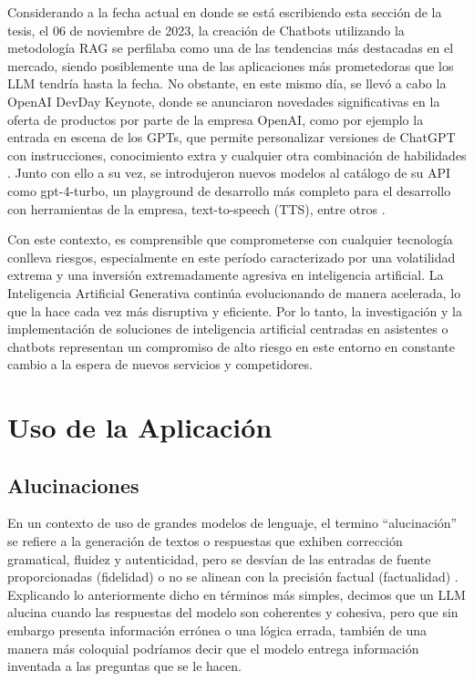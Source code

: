 Considerando a la fecha actual en donde se está escribiendo esta sección de la tesis, el 06 de noviembre de 2023, la creación de Chatbots utilizando la metodología RAG se perfilaba como 
una de las tendencias más destacadas en el mercado, siendo posiblemente una de las aplicaciones más prometedoras que los LLM tendría hasta la fecha. 
No obstante, en este mismo día, se llevó a cabo la OpenAI DevDay Keynote, donde se anunciaron novedades significativas en la oferta de productos por parte de la empresa OpenAI, como por ejemplo la entrada en 
escena de los GPTs, que permite personalizar versiones de ChatGPT con instrucciones, conocimiento extra y cualquier otra combinación 
de habilidades \cite{openai2}. Junto con ello a su vez, se introdujeron nuevos modelos al catálogo de su API como gpt-4-turbo, un playground de desarrollo más completo para el desarrollo con herramientas de la empresa, 
text-to-speech (TTS), entre otros \cite{openai3}.

Con este contexto, es comprensible que comprometerse con cualquier tecnología conlleva riesgos, especialmente en este período caracterizado por una 
volatilidad extrema y una inversión extremadamente agresiva en inteligencia artificial. La Inteligencia Artificial Generativa 
continúa evolucionando de manera acelerada, lo que la hace cada vez más disruptiva y eficiente. Por lo tanto, la investigación 
y la implementación de soluciones de inteligencia artificial centradas en asistentes o chatbots representan un compromiso de alto 
riesgo en este entorno en constante cambio a la espera de nuevos servicios y competidores.


\newpage

\section{Uso de la Aplicación}

\subsection{Alucinaciones}

En un contexto de uso de grandes modelos de lenguaje, el termino ``alucinación'' se refiere a la generación de textos o respuestas que exhiben corrección gramatical, fluidez y autenticidad,
pero se desvían de las entradas de fuente proporcionadas (fidelidad) o no se alinean con la precisión factual (factualidad) \cite{alucionacion1}.
Explicando lo anteriormente dicho en términos más simples, decimos que un LLM alucina cuando las respuestas del modelo son coherentes y cohesiva, pero que sin embargo presenta información errónea o una lógica errada, también de una manera más coloquial podríamos decir que el modelo entrega información inventada a las preguntas que se le hacen.   

